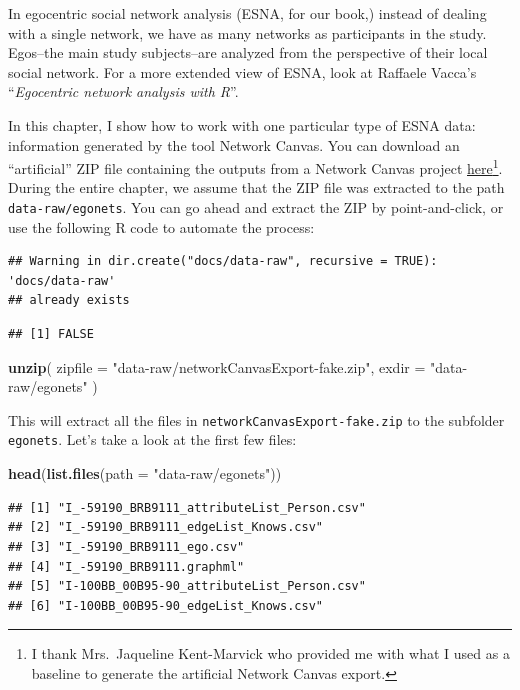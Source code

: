 \documentclass[
]{book}
\newenvironment{Shaded}{\begin{snugshade}}{\end{snugshade}}
\newcommand{\AttributeTok}[1]{\textcolor[rgb]{0.13,0.29,0.53}{#1}}
\newcommand{\FunctionTok}[1]{\textcolor[rgb]{0.13,0.29,0.53}{\textbf{#1}}}
\newcommand{\NormalTok}[1]{#1}
\newcommand{\StringTok}[1]{\textcolor[rgb]{0.31,0.60,0.02}{#1}}
\begin{document}
In egocentric social network analysis (ESNA, for our book,) instead of dealing with a single network, we have as many networks as participants in the study. Egos--the main study subjects--are analyzed from the perspective of their local social network. For a more extended view of ESNA, look at Raffaele Vacca's ``\emph{Egocentric network analysis with R}''.

In this chapter, I show how to work with one particular type of ESNA data: information generated by the tool Network Canvas. You can download an ``artificial'' ZIP file containing the outputs from a Network Canvas project \href{data-raw/networkCanvasExport-fake.zip}{here}\footnote{I thank Mrs.~Jaqueline Kent-Marvick who provided me with what I used as a baseline to generate the artificial Network Canvas export.}. During the entire chapter, we assume that the ZIP file was extracted to the path \texttt{data-raw/egonets}. You can go ahead and extract the ZIP by point-and-click, or use the following R code to automate the process:

\begin{verbatim}
## Warning in dir.create("docs/data-raw", recursive = TRUE): 'docs/data-raw'
## already exists
\end{verbatim}

\begin{verbatim}
## [1] FALSE
\end{verbatim}

\begin{Shaded}
\begin{Highlighting}[]
\FunctionTok{unzip}\NormalTok{(}
  \AttributeTok{zipfile =} \StringTok{"data{-}raw/networkCanvasExport{-}fake.zip"}\NormalTok{,}
  \AttributeTok{exdir   =} \StringTok{"data{-}raw/egonets"}
\NormalTok{  )}
\end{Highlighting}
\end{Shaded}

This will extract all the files in \texttt{networkCanvasExport-fake.zip} to the subfolder \texttt{egonets}. Let's take a look at the first few files:

\begin{Shaded}
\begin{Highlighting}[]
\FunctionTok{head}\NormalTok{(}\FunctionTok{list.files}\NormalTok{(}\AttributeTok{path =} \StringTok{"data{-}raw/egonets"}\NormalTok{))}
\end{Highlighting}
\end{Shaded}

\begin{verbatim}
## [1] "I_-59190_BRB9111_attributeList_Person.csv"
## [2] "I_-59190_BRB9111_edgeList_Knows.csv"      
## [3] "I_-59190_BRB9111_ego.csv"                 
## [4] "I_-59190_BRB9111.graphml"                 
## [5] "I-100BB_00B95-90_attributeList_Person.csv"
## [6] "I-100BB_00B95-90_edgeList_Knows.csv"
\end{verbatim}
\end{document}
